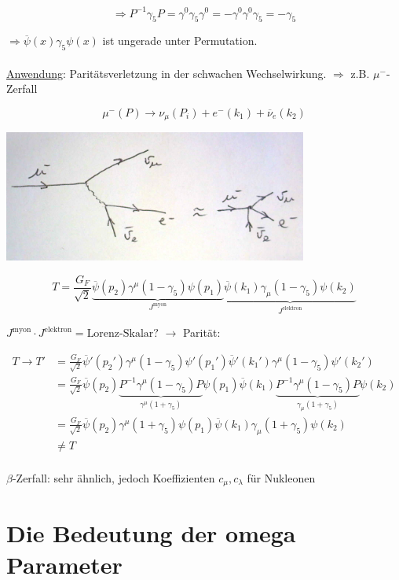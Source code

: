 \[\Rightarrow P^{-1}\gamma_5 P = \gamma^0\gamma_5\gamma^0 = -\gamma^0\gamma^0\gamma_5 = -\gamma_5\]

\(\Rightarrow \overline\psi(x) \gamma_5\psi(x)\) ist ungerade unter Permutation.\\
\\
\underline{Anwendung}: Paritätsverletzung in der schwachen Wechselwirkung. \(\Rightarrow \) z.B. \(\mu^-\)-Zerfall

\[\mu^-(P) \rightarrow \nu_\mu(P_i) + e^-(k_1) + \overline \nu_e(k_2)\]


 \includegraphics[width=0.75\textwidth]{kap06_01.png}




\[T= \frac{G_F}{\sqrt{2}}\underbrace{  \overline\psi(p_2)\gamma^\mu(1-\gamma_5)\psi(p_1)}_{J^{\text{myon}}} \underbrace{\overline\psi(k_1)\gamma_\mu(1-\gamma_5)\psi(k_2)}_{J^{\text{elektron}}}\]


\(J^{\text{myon}}\cdot J^{\text{elektron}} = \text{Lorenz-Skalar?}\) \(\rightarrow \) Parität:

\begin{align}
T\rightarrow T' &=\frac{G_F}{\sqrt{2}} \overline\psi'(p_2')\gamma^\mu(1-\gamma_5) \psi'(p_1')   \overline\psi'(k_1')\gamma^\mu(1-\gamma_5) \psi'(k_2') \\
&=\frac{G_F}{\sqrt{2}} \overline\psi(p_2)\underbrace{P^{-1}\gamma^\mu(1-\gamma_5)P}_{\gamma^\mu (1+\gamma_5)}  \psi(p_1)   \overline\psi(k_1)\underbrace{P^{-1}\gamma^\mu(1-\gamma_5)P}_{\gamma_\mu (1+\gamma_5)} \psi(k_2) \\
&=\frac{G_F}{\sqrt{2}} \overline\psi(p_2)\gamma^\mu (1+\gamma_5) \psi(p_1)   \overline\psi(k_1)\gamma_\mu (1+\gamma_5) \psi(k_2)\\
 &\neq T\\
\end{align}

\(\beta\)-Zerfall: sehr ähnlich, jedoch Koeffizienten \(c_\mu,c_\lambda\) für Nukleonen


\section{Die Bedeutung der omega Parameter}



